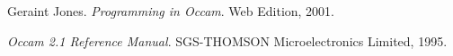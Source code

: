

\begin{thebibliography}{99}

  Geraint Jones.
  \textit{Programming in Occam}.
  Web Edition, 2001.

  \textit{Occam 2.1 Reference Manual}.
  SGS-THOMSON Microelectronics Limited, 1995.

\end{thebibliography}
